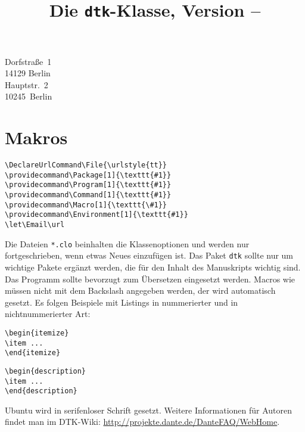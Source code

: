 \documentclass[ngerman]{dtk}
\let\File\texttt
\let\Package\texttt
\begin{document}
\title{Die \texttt{dtk}-Klasse, Version \DTKversion -- \DTKversiondate}
%
    {Dorfstraße~1\\
     14129 Berlin\\
     }
%
    {Hauptstr.~2\\
     10245~Berlin\\
     }
\maketitle

\section{Makros}

\begin{verbatim}
\DeclareUrlCommand\File{\urlstyle{tt}}
\providecommand\Package[1]{\texttt{#1}}
\providecommand\Program[1]{\texttt{#1}}
\providecommand\Command[1]{\texttt{#1}}
\providecommand\Macro[1]{\texttt{\#1}}
\providecommand\Environment[1]{\texttt{#1}}
\let\Email\url
\end{verbatim}

Die Dateien \File{*.clo} beinhalten die Klassenoptionen und
werden nur fortgeschrieben, wenn etwas Neues einzufügen ist. Das Paket
\Package{dtk} sollte nur um wichtige Pakete ergänzt werden, die für den Inhalt
des Manuskripts wichtig sind. Das Programm  sollte bevorzugt
zum Übersetzen eingesetzt werden. Macros wie  müssen nicht mit
dem Backslash angegeben werden, der wird automatisch gesetzt. Es folgen
Beispiele mit Listings in nummerierter und in nichtnummerierter Art:

\begin{lstlisting}[style=number]
\begin{itemize}
\item ...
\end{itemize}
\end{lstlisting}

\begin{lstlisting}[style=noNumber]
\begin{description}
\item ...
\end{description}
\end{lstlisting}

\textsf{Ubuntu} wird in serifenloser Schrift gesetzt.
Weitere Informationen für Autoren findet man im DTK-Wiki:
\url{http://projekte.dante.de/DanteFAQ/WebHome}.
\end{document}
